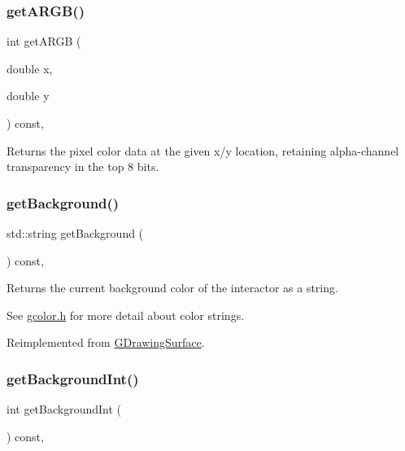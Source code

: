 \subsubsection{\texorpdfstring{get\+A\+R\+G\+B()}{getARGB()}}
{\footnotesize\ttfamily int get\+A\+R\+GB (\begin{DoxyParamCaption}\item[{double}]{x,  }\item[{double}]{y }\end{DoxyParamCaption}) const\hspace{0.3cm}{\ttfamily [virtual]}, {\ttfamily [inherited]}}



Returns the pixel color data at the given x/y location, retaining alpha-\/channel transparency in the top 8 bits. 

\mbox{\label{classsgl_1_1GCanvas_a4a62c51b7244a7642b88065e3a07ae82}} 
\subsubsection{\texorpdfstring{get\+Background()}{getBackground()}}
{\footnotesize\ttfamily std\+::string get\+Background (\begin{DoxyParamCaption}{ }\end{DoxyParamCaption}) const\hspace{0.3cm}{\ttfamily [override]}, {\ttfamily [virtual]}}



Returns the current background color of the interactor as a string. 

See \mbox{\hyperlink{gcolor_8h_source}{gcolor.\+h}} for more detail about color strings. 

Reimplemented from \mbox{\hyperlink{classsgl_1_1GDrawingSurface_a808e22cc1fdfbecf71ed8c64ef4600e0}{G\+Drawing\+Surface}}.

\mbox{\label{classsgl_1_1GCanvas_acd4f2b3b9619dacdfd71fc0004cac382}} 
\subsubsection{\texorpdfstring{get\+Background\+Int()}{getBackgroundInt()}}
{\footnotesize\ttfamily int get\+Background\+Int (\begin{DoxyParamCaption}{ }\end{DoxyParamCaption}) const\hspace{0.3cm}{\ttfamily [override]}, {\ttfamily [virtual]}}



